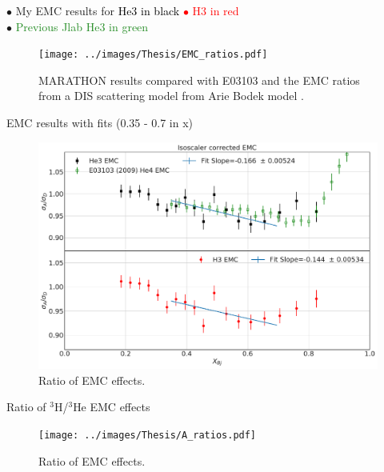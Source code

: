 \documentclass[12pt,usenames,dvipsnames]{beamer}
\begin{document}
\begin{frame}{}
$\bullet$ My EMC results for \textcolor{black}{He3 in black} \textcolor{red}{$\bullet$ H3 in red}\\
$\bullet$ \textcolor{ForestGreen}{Previous Jlab He3 in green}
\begin{figure}
\texttt{[image: ../images/Thesis/EMC\_ratios.pdf]}
\caption*{MARATHON results compared with E03103 \cite{E3103} and the EMC ratios from a DIS scattering model from Arie Bodek model \cite{bodek}.}
\end{figure}
\end{frame}

\begin{frame}{EMC results with fits (0.35 - 0.7 in x)}
	\vspace{-20pt}
	\begin{figure}
		\includegraphics[width=12cm]{../images/EMCfits.pdf}
		\caption*{Ratio of EMC effects.}
	\end{figure}
\end{frame}




\begin{frame}{Ratio of $^3$H/$^3$He EMC effects}
\vspace{-20pt}
\begin{figure}
\texttt{[image: ../images/Thesis/A\_ratios.pdf]}
\caption*{Ratio of EMC effects.}
\end{figure}
\end{frame}
\end{document}
